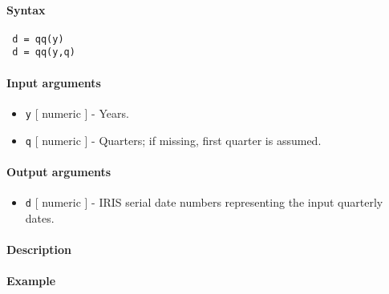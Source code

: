 


	\paragraph{Syntax}
 
 \begin{verbatim}
 d = qq(y)
 d = qq(y,q)
 \end{verbatim}
 
 \paragraph{Input arguments}
 
 \begin{itemize}
 \item
   \texttt{y} {[} numeric {]} - Years.
 \item
   \texttt{q} {[} numeric {]} - Quarters; if missing, first quarter is
   assumed.
 \end{itemize}
 
 \paragraph{Output arguments}
 
 \begin{itemize}
 \item
   \texttt{d} {[} numeric {]} - IRIS serial date numbers representing the
   input quarterly dates.
 \end{itemize}
 
 \paragraph{Description}
 
 \paragraph{Example}


